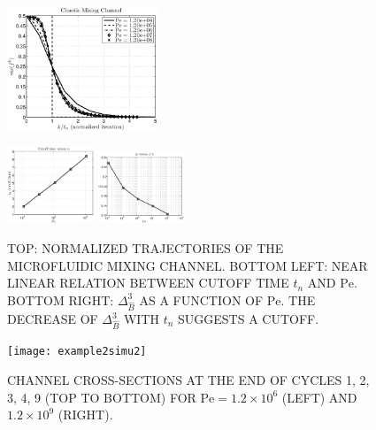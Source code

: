 \documentclass[twocolumn,10pt]{asme2e}
\begin{document}
  \begin{figure}
    \begin{center}
     \includegraphics[width=0.4\textwidth]{mixingchannelcutoff}
    \end{center} 
     \includegraphics[width=0.23\textwidth]{mixingchannelcutofftimevsPe}
     \includegraphics[width=0.23\textwidth]{mixingchannelareavsPe}
    \caption{\label{mixingchannelcutoff} TOP: NORMALIZED TRAJECTORIES
      OF THE MICROFLUIDIC MIXING CHANNEL. BOTTOM LEFT: NEAR LINEAR
      RELATION BETWEEN CUTOFF TIME $t_n$ AND $\text{Pe}$. BOTTOM
      RIGHT: $\Delta_{\hat{B}}^3$ AS A FUNCTION OF $\text{Pe}$. THE
      DECREASE OF $\Delta_{\hat{B}}^3$ WITH $t_n$ SUGGESTS A CUTOFF.}
  \end{figure}

  \begin{figure}
    \centerline{
     \texttt{[image: example2simu2]} 
    }
    \caption{\label{example2simu} CHANNEL CROSS-SECTIONS AT THE END OF
      CYCLES 1, 2, 3, 4, 9 (TOP TO BOTTOM) FOR $\text{Pe} =
      1.2\times10^6$ (LEFT) AND $1.2\times10^9$ (RIGHT).}
  \end{figure}
\end{document}
